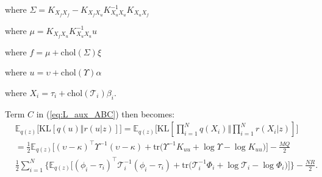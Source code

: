 \documentclass[12pt]{article}
\newcommand{\Tau}{\mathcal{T}}
\newcommand{\Kff}{K_{X_fX_f}}
\newcommand{\Kuu}{K_{X_uX_u}}
\newcommand{\Kuf}{K_{X_uX_f}}
\newcommand{\Kfu}{K_{X_fX_u}}
\newcommand{\chol}{\mathrm{chol}}
\begin{document}
where $\Sigma = \Kff - \Kfu\Kuu^{-1}\Kuf$

where $\mu   = \Kfu\Kuu^{-1}u$

where $f = \mu + \chol(\Sigma)\xi $

where $u = \upsilon + \chol(\Upsilon)\alpha$

where $X_i = \tau_i + \chol(\Tau_i)\beta_i$.

Term $C$ in (\ref{eq:L_aux_ABC}) then becomes:
%
\begin{align}
    &\mathbb{E}_{q(z)}\big[ \text{KL}[q(u)\Vert r(u|z)] \big] = \mathbb{E}_{q(z)}\big[ \text{KL}[\prod_{i=1}^Nq(X_i)\Vert \prod_{i=1}^Nr(X_i|z)] \big]\\
    &= \frac{1}{2}\mathbb{E}_{q(z)}\big[ (\upsilon - \kappa)^\top\Upsilon^{-1}(\upsilon - \kappa) + \text{tr}\big( \Upsilon^{-1}K_{uu} + \log\Upsilon - \log K_{uu} \big) \big] - \frac{MQ}{2}\\
    &\frac{1}{2}\sum_{i=1}^N \big\{ \mathbb{E}_{q(z)}\big[ (\phi_i - \tau_i)^\top\Tau_i^{-1}(\phi_i - \tau_i) + \text{tr}\big( \Tau_i^{-1}\Phi_i + \log\Tau_i - \log\Phi_i \big) \big] \big\} - \frac{NR}{2}.
\end{align}
\end{document}
